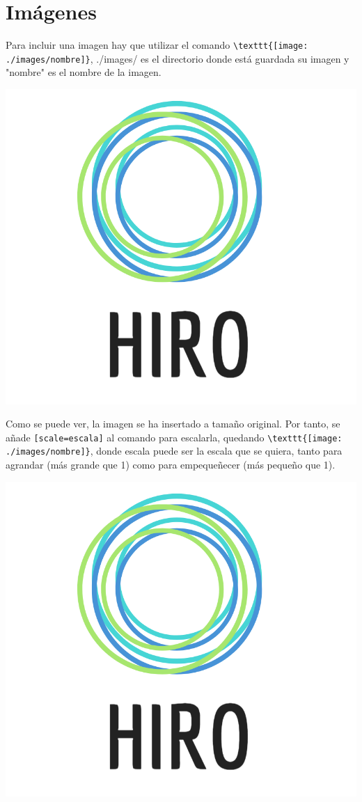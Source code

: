 \chapter{Imágenes}

Para incluir una imagen hay que utilizar el comando \verb!\texttt{[image: ./images/nombre]}!, ./images/ es el directorio donde está guardada su imagen y "nombre" es el nombre de la imagen.

\includegraphics{./images/HIRO}

Como se puede ver, la imagen se ha insertado a tamaño original. Por tanto, se añade \verb![scale=escala]! al comando para escalarla, quedando \verb!\texttt{[image: ./images/nombre]}!, donde escala puede ser la escala que se quiera, tanto para agrandar (más grande que 1) como para empequeñecer (más pequeño que 1).

\includegraphics[scale=0.35]{./images/HIRO}

